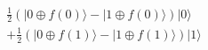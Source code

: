 \documentclass[preview]{standalone}
\begin{document}
\begin{align*}
\frac{1}{2} (|0 \oplus f(0) \rangle - |1 \oplus f(0) \rangle) |0\rangle \\ + \frac{1}{2}(|0\oplus f(1) \rangle - |1 \oplus f(1) \rangle)|1\rangle
\end{align*}
\end{document}
